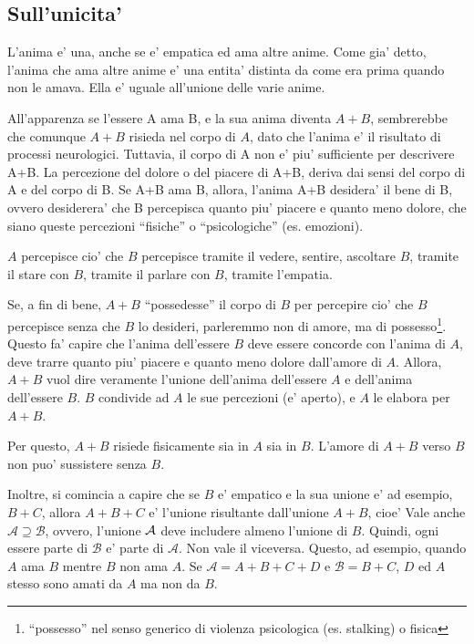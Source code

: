 \subsection{Sull'unicita'}

L'anima e' una, anche se e' empatica ed ama altre anime. Come gia' detto, l'anima che ama altre anime e' una entita' distinta da come era prima quando non le amava. Ella e' uguale all'unione delle varie anime. 

All'apparenza se l'essere A ama B, e la sua anima diventa $A+B$, sembrerebbe che comunque $A+B$ risieda nel corpo di $A$, dato che l'anima e' il risultato di processi neurologici. Tuttavia, il corpo di A non e' piu' sufficiente per descrivere A+B. La percezione del dolore o del piacere di A+B, deriva dai sensi del corpo di A e del corpo di B. Se A+B ama B, allora, l'anima A+B desidera' il bene di B, ovvero desiderera' che B percepisca quanto piu' piacere e quanto meno dolore, che siano queste percezioni ``fisiche'' o ``psicologiche'' (es. emozioni). 

$A$ percepisce cio' che  $B$ percepisce tramite il vedere, sentire, ascoltare $B$, tramite il stare con $B$, tramite il parlare con $B$, tramite l'empatia.

Se, a fin di bene, $A+B$ ``possedesse'' il corpo di $B$ per percepire cio' che $B$ percepisce senza che $B$ lo desideri, parleremmo non di amore, ma di possesso\footnote{``possesso'' nel senso generico di violenza psicologica (es. stalking) o fisica}. Questo fa' capire che l'anima dell'essere $B$ deve essere concorde con l'anima di $A$, deve trarre quanto piu' piacere e quanto meno dolore dall'amore di $A$. Allora, $A+B$ vuol dire veramente l'unione dell'anima dell'essere $A$ e dell'anima dell'essere $B$. $B$ condivide ad $A$ le sue percezioni (e' aperto), e $A$ le elabora per $A+B$. 

Per questo, $A+B$ risiede fisicamente sia in $A$ sia in $B$. L'amore di $A+B$ verso $B$ non puo' sussistere senza $B$. 

Inoltre, si comincia a capire che se $B$ e' empatico e la sua unione e' ad esempio, $B+C$, allora $A+B+C$ e' l'unione risultante dall'unione $A+B$, cioe'
Vale anche $\mathcal{A} \supseteq \mathcal{B}$, ovvero, l'unione $\mathcal{A}$ deve includere almeno l'unione di $B$. Quindi, ogni essere parte di $\mathcal{B}$ e' parte di $\mathcal{A}$. Non vale il viceversa. Questo, ad esempio, quando $A$ ama $B$ mentre $B$ non ama $A$. Se $\mathcal{A}=A+B+C+D$ e $\mathcal{B}=B+C$, $D$ ed $A$ stesso sono amati da $A$ ma non da $B$.

